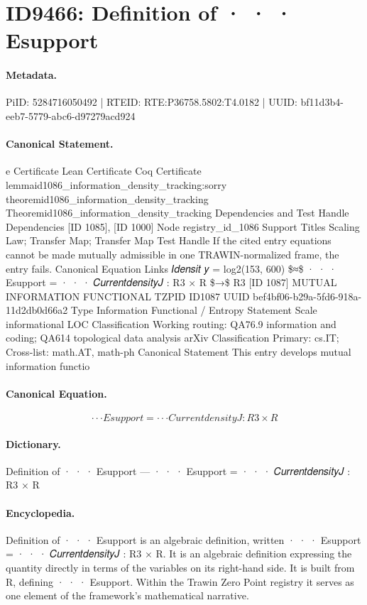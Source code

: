 \section*{ID9466: Definition of · · · Esupport}
\paragraph{Metadata.}
PiID: 5284716050492 | RTEID: RTE:P36758.5802:T4.0182 | UUID: bf11d3b4-eeb7-5779-abc6-d97279acd924

\paragraph{Canonical Statement.}
e Certificate Lean Certificate Coq Certificate lemmaid1086\_information\_density\_tracking:sorry theoremid1086\_information\_density\_tracking Theoremid1086\_information\_density\_tracking Dependencies and Test Handle Dependencies [ID 1085], [ID 1000] Node registry\_id\_1086 Support Titles Scaling Law; Transfer Map; Transfer Map Test Handle If the cited entry equations cannot be made mutually admissible in one TRAWIN-normalized frame, the entry fails. Canonical Equation Links 𝐼𝑑𝑒𝑛𝑠𝑖𝑡 𝑦 = log2(153, 600) \$≈\$ · · · Esupport = · · · 𝐶𝑢𝑟𝑟𝑒𝑛𝑡𝑑𝑒𝑛𝑠𝑖𝑡𝑦𝐽 : R3 × R \$→\$ R3 [ID 1087] MUTUAL INFORMATION FUNCTIONAL TZPID ID1087 UUID bef4bf06-b29a-5fd6-918a-11d2db0d66a2 Type Information Functional / Entropy Statement Scale informational LOC Classification Working routing: QA76.9 information and coding; QA614 topological data analysis arXiv Classification Primary: cs.IT; Cross-list: math.AT, math-ph Canonical Statement This entry develops mutual information functio

\paragraph{Canonical Equation.}
\[
· · · Esupport = · · · 𝐶𝑢𝑟𝑟𝑒𝑛𝑡𝑑𝑒𝑛𝑠𝑖𝑡𝑦𝐽 : R3 × R
\]

\paragraph{Dictionary.}
Definition of · · · Esupport — · · · Esupport = · · · 𝐶𝑢𝑟𝑟𝑒𝑛𝑡𝑑𝑒𝑛𝑠𝑖𝑡𝑦𝐽 : R3 × R

\paragraph{Encyclopedia.}
Definition of · · · Esupport is an algebraic definition, written · · · Esupport = · · · 𝐶𝑢𝑟𝑟𝑒𝑛𝑡𝑑𝑒𝑛𝑠𝑖𝑡𝑦𝐽 : R3 × R. It is an algebraic definition expressing the quantity directly in terms of the variables on its right-hand side. It is built from R, defining · · · Esupport. Within the Trawin Zero Point registry it serves as one element of the framework's mathematical narrative.
